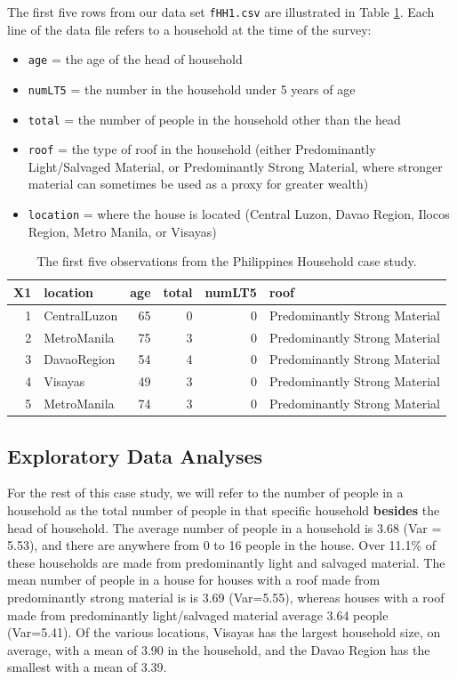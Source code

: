 \documentclass[
]{krantz}
\providecommand{\tightlist}{%
  \setlength{\itemsep}{0pt}\setlength{\parskip}{0pt}}
\begin{document}
The first five rows from our data set \texttt{fHH1.csv} are illustrated in Table \ref{tab:fHH1table1}. Each line of the data file refers to a household at the time of the survey:

\begin{itemize}
\tightlist
\item
  \texttt{age} = the age of the head of household
\item
  \texttt{numLT5} = the number in the household under 5 years of age
\item
  \texttt{total} = the number of people in the household other than the head
\item
  \texttt{roof} = the type of roof in the household (either Predominantly Light/Salvaged Material, or Predominantly Strong Material, where stronger material can sometimes be used as a proxy for greater wealth)
\item
  \texttt{location} = where the house is located (Central Luzon, Davao Region, Ilocos Region, Metro Manila, or Visayas)
\end{itemize}

\begin{table}[t]

\caption{\label{tab:fHH1table1}The first five observations from the Philippines Household case study.}
\centering
\begin{tabular}{rlrrrl}
\toprule
X1 & location & age & total & numLT5 & roof\\
\midrule
1 & CentralLuzon & 65 & 0 & 0 & Predominantly Strong Material\\
2 & MetroManila & 75 & 3 & 0 & Predominantly Strong Material\\
3 & DavaoRegion & 54 & 4 & 0 & Predominantly Strong Material\\
4 & Visayas & 49 & 3 & 0 & Predominantly Strong Material\\
5 & MetroManila & 74 & 3 & 0 & Predominantly Strong Material\\
\bottomrule
\end{tabular}
\end{table}

\hypertarget{explore}{%
\subsection{Exploratory Data Analyses}\label{explore}}

For the rest of this case study, we will refer to the number of people in a household as the total number of people in that specific household \textbf{besides} the head of household. The average number of people in a household is 3.68 (Var = 5.53), and there are anywhere from 0 to 16 people in the house. Over 11.1\% of these households are made from predominantly light and salvaged material. The mean number of people in a house for houses with a roof made from predominantly strong material is is 3.69 (Var=5.55), whereas houses with a roof made from predominantly light/salvaged material average 3.64 people (Var=5.41). Of the various locations, Visayas has the largest household size, on average, with a mean of 3.90 in the household, and the Davao Region has the smallest with a mean of 3.39.
\end{document}
